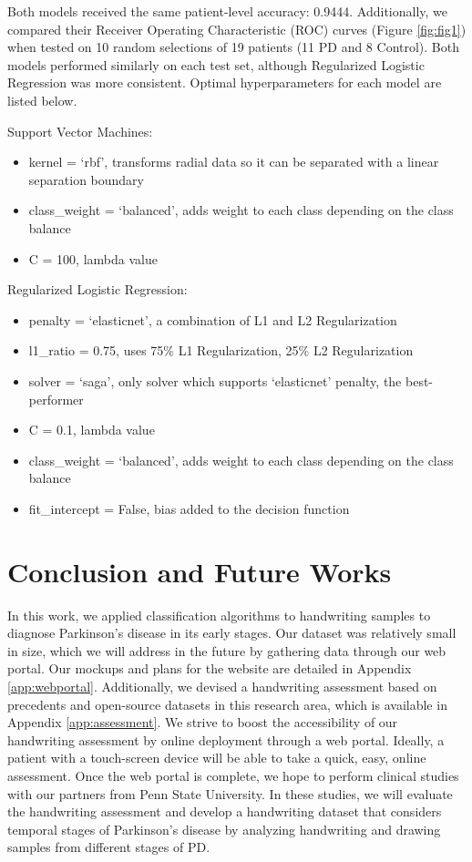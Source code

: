 \documentclass[pmlr,twocolumn,10pt,breaklinks, x11names,table]{jmlr} %
\begin{document}
Both models received the same patient-level accuracy: 0.9444. Additionally, we compared their Receiver Operating Characteristic (ROC) curves (Figure \ref{fig:fig1}) when tested on 10 random selections of 19 patients (11 PD and 8 Control). Both models performed similarly on each test set, although Regularized Logistic Regression was more consistent. Optimal hyperparameters for each model are listed below.

Support Vector Machines:
\begin{itemize}
\item kernel = ‘rbf’, transforms radial data so it can be separated with a linear separation boundary
\item class\_weight = ‘balanced’, adds weight to each class depending on the class balance
\item C = 100, lambda value
\end{itemize}

Regularized Logistic Regression:
\begin{itemize}
\item penalty = ‘elasticnet’, a combination of L1 and L2 Regularization
\item l1\_ratio = 0.75, uses 75\% L1 Regularization, 25\% L2 Regularization
\item solver = ‘saga’, only solver which supports ‘elasticnet’ penalty, the best-performer
\item C = 0.1, lambda value
\item class\_weight = ‘balanced’, adds weight to each class depending on the class balance
\item fit\_intercept = False, bias added to the decision function
\end{itemize}

\section{Conclusion and Future Works}
\label{Conclusion+FutureWorks} 
In this work, we applied classification algorithms to handwriting samples to diagnose Parkinson's disease in its early stages. Our dataset was relatively small in size, which we will address in the future by gathering data through our web portal. Our mockups and plans for the website are detailed in Appendix \ref{app:webportal}.  Additionally, we devised a handwriting assessment based on precedents and open-source datasets in this research area, which is available in Appendix \ref{app:assessment}. We strive to boost the accessibility of our handwriting assessment by online deployment through a web portal. Ideally, a patient with a touch-screen device will be able to take a quick, easy, online assessment. Once the web portal is complete, we hope to perform clinical studies with our partners from Penn State University. In these studies, we will evaluate the handwriting assessment and develop a handwriting dataset that considers temporal stages of Parkinson’s disease by analyzing handwriting and drawing samples from different stages of PD. 
\end{document}
